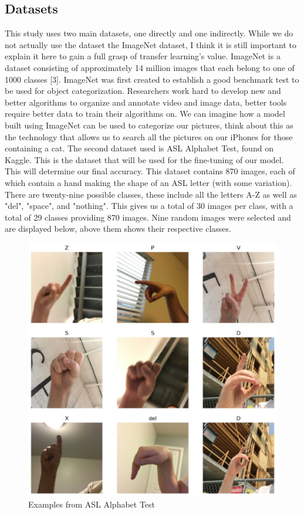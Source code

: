 \documentclass[12pt]{article}
\begin{document}
\subsection{Datasets}
This study uses two main datasets, one directly and one indirectly. While we do not actually use the dataset the ImageNet dataset, I think it is still important to explain it here to gain a full grasp of 
transfer learning's value. ImageNet is a dataset consisting of approximately 14 million images that each belong to one of 1000 classes [3]. ImageNet was first created to establish a good benchmark test
to be used for object categorization. Researchers work hard to develop new and better algorithms to organize and annotate video and image data, better tools require better data to train their algorithms on.
We can imagine how a model built using ImageNet can be used to categorize our pictures, think about this as the technology that allows us to search all the pictures on our iPhones for those containing a cat. 
The second dataset used is ASL Alphabet Test, found on Kaggle. This is the dataset that will be used for the fine-tuning of our model. This will determine our final accuracy. This dataset contains 870 images, each of which contain a hand making the shape of an ASL letter (with some variation). There are
twenty-nine possible classes, these include all the letters A-Z as well as "del", "space", and "nothing". This gives us a total of 30 images per class, with a total of 29 classes providing 870 images.
Nine random images were selected and are displayed below, above them shows their respective classes.\\
\begin{figure}[H]
    \centering
    \includegraphics*[scale=0.25]{images/example_from_dataset.JPG}\\
    Examples from ASL Alphabet Test
\end{figure}
\end{document}

